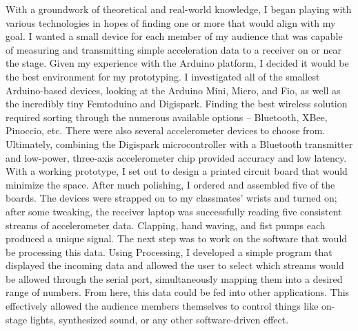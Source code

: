 With a groundwork of theoretical and real-world knowledge, I began playing with various technologies in hopes of finding one or more that would align with my goal. I wanted a small device for each member of my audience that was capable of measuring and transmitting simple acceleration data to a receiver on or near the stage. Given my experience with the Arduino platform, I decided it would be the best environment for my prototyping. I investigated all of the smallest Arduino-based devices, looking at the Arduino Mini, Micro, and Fio, as well as the incredibly tiny Femtoduino and Digispark. Finding the best wireless solution required sorting through the numerous available options -- Bluetooth, XBee, Pinoccio, etc. There were also several accelerometer devices to choose from. Ultimately, combining the Digispark microcontroller with a Bluetooth transmitter and low-power, three-axis accelerometer chip provided accuracy and low latency. With a working prototype, I set out to design a printed circuit board that would minimize the space. After much polishing, I ordered and assembled five of the boards. The devices were strapped on to my classmates' wrists and turned on; after some tweaking, the receiver laptop was successfully reading five consistent streams of accelerometer data. Clapping, hand waving, and fist pumps each produced a unique signal. The next step was to work on the software that would be processing this data. Using Processing, I developed a simple program that displayed the incoming data and allowed the user to select which streams would be allowed through the serial port, simultaneously mapping them into a desired range of numbers. From here, this data could be fed into other applications. This effectively allowed the audience members themselves to control things like on-stage lights, synthesized sound, or any other software-driven effect.


